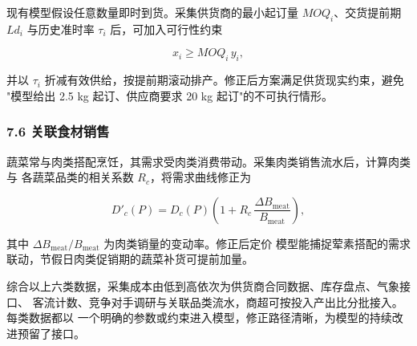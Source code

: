 现有模型假设任意数量即时到货。采集供货商的最小起订量 $MOQ_i$、交货提前期
$Ld_i$ 与历史准时率 $\tau_i$ 后，可加入可行性约束

\begin{equation}
x_i\ge MOQ_i\,y_i,
\label{eq:q4_moq}
\end{equation}

并以 $\tau_i$ 折减有效供给，按提前期滚动排产。修正后方案满足供货现实约束，避免
"模型给出 2.5 kg 起订、供应商要求 20 kg 起订"的不可执行情形。

\subsubsection{7.6 关联食材销售}

蔬菜常与肉类搭配烹饪，其需求受肉类消费带动。采集肉类销售流水后，计算肉类与
各蔬菜品类的相关系数 $R_c$，将需求曲线修正为

\begin{equation}
D'_c(P)=D_c(P)\left(1+R_c\,\frac{\Delta B_{\mathrm{meat}}}{B_{\mathrm{meat}}}\right),
\label{eq:q4_meat}
\end{equation}

其中 $\Delta B_{\mathrm{meat}}/B_{\mathrm{meat}}$ 为肉类销量的变动率。修正后定价
模型能捕捉荤素搭配的需求联动，节假日肉类促销期的蔬菜补货可提前加量。

综合以上六类数据，采集成本由低到高依次为供货商合同数据、库存盘点、气象接口、
客流计数、竞争对手调研与关联品类流水，商超可按投入产出比分批接入。每类数据都以
一个明确的参数或约束进入模型，修正路径清晰，为模型的持续改进预留了接口。
